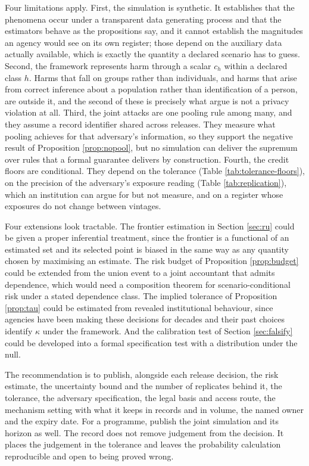 \documentclass[11pt,a4paper]{article}
\theoremstyle{plain}
\theoremstyle{definition}
\theoremstyle{definition}
\theoremstyle{plain}
\begin{document}
Four limitations apply. First, the simulation is synthetic.
It establishes that the phenomena occur under a transparent data generating
process and that the estimators behave as the propositions say, and it cannot
establish the magnitudes an agency would see on its own register; those depend
on the auxiliary data actually available, which is exactly the quantity a
declared scenario has to guess. Second, the framework represents harm through a
scalar $c_h$ within a declared class $h$. Harms that fall on groups rather than
individuals, and harms that arise from correct inference about a population
rather than identification of a person, are outside it, and the second of these
is precisely what \citet{dwork2014} argue is not a privacy violation at all.
Third, the joint attacks are one pooling rule among many, and they assume a
record identifier shared across releases. They measure what pooling achieves for
that adversary's information, so they support the negative result of
Proposition \ref{prop:nopool}, but no simulation can deliver the supremum over
rules that a formal guarantee delivers by construction. Fourth, the credit
floors are conditional. They depend on the tolerance (Table
\ref{tab:tolerance-floors}), on the precision of the adversary's exposure reading
(Table \ref{tab:replication}), which an institution can argue for but not
measure, and on a register whose exposures do not change between vintages.

Four extensions look tractable. The frontier estimation in Section
\ref{sec:ru} could be given a proper inferential treatment, since the frontier is a functional of an estimated set and its selected point
is biased in the same way as any quantity chosen by maximising an estimate. The risk budget of Proposition
\ref{prop:budget} could be extended from the union event to a joint accountant
that admits dependence, which would need a composition theorem for
scenario-conditional risk under a stated dependence class. The implied tolerance
of Proposition \ref{prop:tau} could be estimated from revealed institutional
behaviour, since agencies have been making these decisions for decades and
their past choices identify $\kappa$ under the framework. And the calibration
test of Section \ref{sec:falsify} could be developed into a formal
specification test with a distribution under the null.

The recommendation is to publish, alongside each release decision, the risk
estimate, the uncertainty bound and the number of replicates behind it, the
tolerance, the adversary specification, the legal basis and access route, the
mechanism setting with what it keeps in records and in volume, the named owner
and the expiry date. For a programme, publish the joint simulation and its
horizon as well. The record does not remove judgement from the decision. It
places the judgement in the tolerance and leaves the probability calculation
reproducible and open to being proved wrong.
\end{document}
